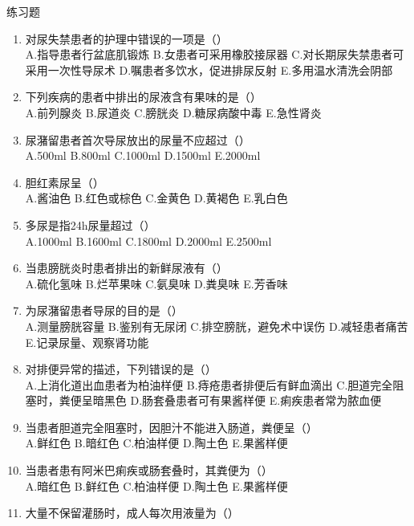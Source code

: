 \documentclass[11pt, a4paper]{ctexart}
\begin{document}
\begin{examplebox}{练习题}
	\begin{enumerate}
		\item 对尿失禁患者的护理中错误的一项是（\qquad）\\
		      A.指导患者行盆底肌锻炼 \quad B.女患者可采用橡胶接尿器 \quad C.对长期尿失禁患者可采用一次性导尿术 \quad D.嘱患者多饮水，促进排尿反射 \quad E.多用温水清洗会阴部
		\item 下列疾病的患者中排出的尿液含有果味的是（\qquad）\\
		      A.前列腺炎 \quad B.尿道炎 \quad C.膀胱炎 \quad D.糖尿病酸中毒 \quad E.急性肾炎
		\item 尿潴留患者首次导尿放出的尿量不应超过（\qquad）\\
		      A.500ml \quad B.800ml \quad C.1000ml \quad D.1500ml \quad E.2000ml
		\item 胆红素尿呈（\qquad）\\
		      A.酱油色 \quad B.红色或棕色 \quad C.金黄色 \quad D.黄褐色 \quad E.乳白色
		\item 多尿是指24h尿量超过（\qquad）\\
		      A.1000ml \quad B.1600ml \quad C.1800ml \quad D.2000ml \quad E.2500ml
		\item 当患膀胱炎时患者排出的新鲜尿液有（\qquad）\\
		      A.硫化氢味 \quad B.烂苹果味 \quad C.氨臭味 \quad D.粪臭味 \quad E.芳香味
		\item 为尿潴留患者导尿的目的是（\qquad）\\
		      A.测量膀胱容量 \quad B.鉴别有无尿闭 \quad C.排空膀胱，避免术中误伤 \quad D.减轻患者痛苦 \quad E.记录尿量、观察肾功能
		\item 对排便异常的描述，下列错误的是（\qquad）\\
		      A.上消化道出血患者为柏油样便 \quad B.痔疮患者排便后有鲜血滴出 \quad C.胆道完全阻塞时，粪便呈暗黑色 \quad D.肠套叠患者可有果酱样便 \quad E.痢疾患者常为脓血便
		\item 当患者胆道完全阻塞时，因胆汁不能进入肠道，粪便呈（\qquad）\\
		      A.鲜红色 \quad B.暗红色 \quad C.柏油样便 \quad D.陶土色 \quad E.果酱样便
		\item 当患者患有阿米巴痢疾或肠套叠时，其粪便为（\qquad）\\
		      A.暗红色 \quad B.鲜红色 \quad C.柏油样便 \quad D.陶土色 \quad E.果酱样便
		\item 大量不保留灌肠时，成人每次用液量为（\qquad）\\

\end{enumerate}
\end{examplebox}
\end{document}
